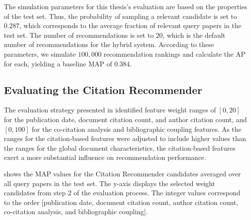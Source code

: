 The simulation parameters for this thesis's evaluation are based on the properties of the test set.
Thus, the probability of sampling a relevant candidate is set to $0.287$, which corresponds to the average fraction of relevant query papers in the test set.
The number of recommendations is set to $20$, which is the default number of recommendations for the hybrid system.
According to these parameters, we simulate $100,000$ recommendation rankings and calculate the \ac{AP} for each, yielding a baseline \ac{MAP} of $0.384$.


\subsection{Evaluating the Citation Recommender} \label{sec:evaluation-citation-recommender}

The evaluation strategy presented in  identified feature weight ranges of $[0, 20]$ for the publication date, document citation count, and author citation count, and $[0, 100]$ for the co-citation analysis and bibliographic coupling features.
As the ranges for the citation-based features were adjusted to include higher values than the ranges for the global document characteristics, the citation-based features exert a more substantial influence on recommendation performance.

 shows the \ac{MAP} values for the Citation Recommender candidates averaged over all query papers in the test set.
The y-axis displays the selected weight candidates from step 2 of the evaluation process. The integer values correspond to the order [publication date, document citation count, author citation count, co-citation analysis, and bibliographic coupling].


